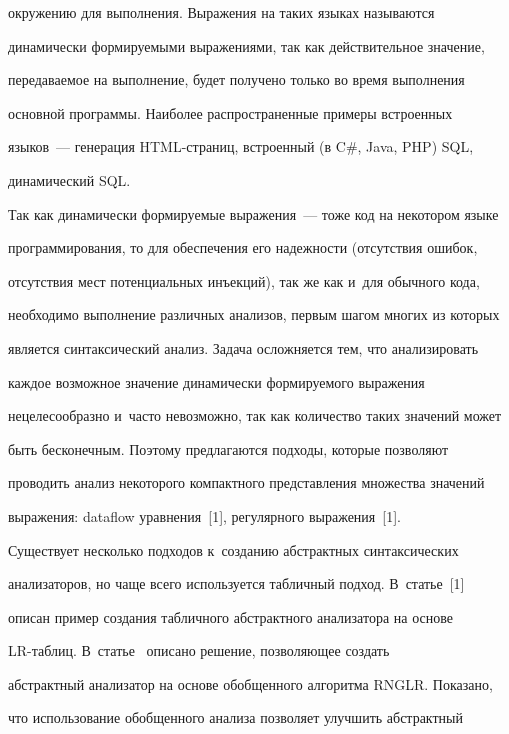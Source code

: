 окружению для выполнения. Выражения на таких языках называются


динамически формируемыми выражениями, так как действительное значение,


передаваемое на выполнение, будет получено только во время выполнения


основной программы. Наиболее распространенные примеры встроенных


языков~--- генерация HTML-стра\-ниц, встроенный (в C\#, Java, PHP) SQL,


динамический SQL.











Так как динамически формируемые выражения~--- тоже код на некотором языке


программирования, то для обеспечения его надежности (отсутствия ошибок,


отсутствия мест потенциальных инъекций), так же как и~для обычного кода,


необходимо выполнение различных анализов, первым шагом многих из которых


является синтаксический анализ. Задача осложняется тем, что анализировать


каждое возможное значение динамически формируемого выражения


нецелесообразно и~часто невозможно, так как количество таких значений может


быть бесконечным. Поэтому предлагаются подходы, которые позволяют


проводить анализ некоторого компактного представления множества значений


выражения: dataflow уравнения~[1], регулярного выражения~[1].





Существует несколько подходов к~созданию абстрактных синтаксических


анализаторов, но чаще всего используется табличный подход. В~статье~[1]


описан пример создания табличного абстрактного анализатора на основе


LR-таб\-лиц. В~статье~\cite{4-gri} описано решение, позволяющее создать


абстрактный анализатор на основе обобщенного алгоритма RNGLR. Показано,


что использование обобщенного анализа позволяет улучшить абстрактный


